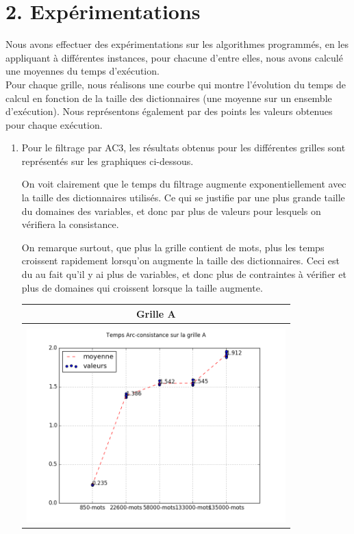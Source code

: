 \documentclass[a4paper,12pt]{report}
\begin{document}
\section*{2. Expérimentations}


Nous avons effectuer des expérimentations sur les algorithmes programmés, en les appliquant à différentes instances, pour chacune d'entre elles, nous avons calculé une moyennes du temps d'exécution.\\
Pour chaque grille, nous réalisons une courbe qui montre l'évolution du temps de calcul en fonction de la taille des dictionnaires (une moyenne sur un ensemble d'exécution). Nous représentons également par des points les valeurs obtenues pour chaque exécution.

\begin{enumerate}


\item Pour le filtrage par AC3, les résultats obtenus pour les différentes grilles sont représentés sur les graphiques ci-dessous.

On voit clairement que le temps du filtrage augmente exponentiellement avec la taille des dictionnaires utilisés. Ce qui se justifie par une plus grande taille du domaines des variables, et donc par plus de valeurs pour lesquels on vérifiera la consistance.

On remarque surtout, que plus la grille contient de mots, plus les temps croissent rapidement lorsqu'on augmente la taille des dictionnaires. Ceci est du au fait qu'il y ai plus de variables, et donc plus de contraintes à vérifier et plus de domaines qui croissent lorsque la taille augmente.\\

\begin{table}[!h]
\begin{center}
\begin{tabular}{|c|}

\hline
  Grille A\\
\hline   
   \\
\includegraphics[width=10cm]{AC3_A.png}  \\
\hline


\end{tabular}
\end{center}
\end{table}
\end{enumerate}
\end{document}
